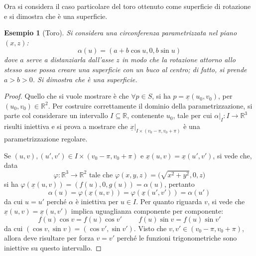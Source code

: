 \documentclass[12pt]{article}
\theoremstyle{style}
\newtheorem{esempio}{Esempio}[section]
\numberwithin{equation}{subsection}
\begin{document}
\noindent Ora si considera il caso particolare del toro ottenuto come superficie di rotazione e si dimostra che \`e una superficie.
\begin{esempio}
	[Toro]
	Si considera una circonferenza parametrizzata nel piano $(x,z)$:
	\[
	\alpha (u) = (a + b\cos u , 0 , b \sin u)
	\] 
	dove $a$ serve a distanziarla dall'asse $z$ in modo che la rotazione attorno allo stesso asse possa creare una superficie con un buco al centro; di fatto, si prende $a > b > 0$.
	Si dimostra che \`e una superficie.
\end{esempio}
\begin{proof}
	Quello che si vuole mostrare \`e che $\forall p \in S$, si ha $p = \underline{x}(u_0,v_0)$, per $(u_0,v_0) \in \mathbb{R}^2$.
	Per costruire correttamente il dominio della parametrizzazione, si parte col considerare un intervallo $I \subseteq \mathbb{R}$, contenente $u_0$, tale per cui $\alpha |_I:I\to\mathbb{R}^3$ risulti iniettiva e si prova a mostrare che $\underline{x}|_{I \times (v_0-\pi,v_0+\pi)} $ \`e una parametrizzazione regolare.

	Se $(u,v), (u',v') \in I \times (v_0-\pi,v_0+\pi)$ e $\underline{x}(u,v) = \underline{x}(u',v')$, si vede che, data
	\[
	\varphi : \mathbb{R}^3 \to \mathbb{R}^2 \text{ tale che } \varphi (x,y,z) = \big(\sqrt{x^2 + y^2 } ,0,z\big)
	\] 
	si ha $\varphi (\underline{x}(u,v)) = (f(u),0,g(u)) = \alpha (u)$, pertanto 
	\[
	\alpha (u) = \varphi (\underline{x}(u,v)) = \varphi (\underline{x}(u',v')) = \alpha (u')
	\] 
	da cui $u = u'$ perch\'e $\alpha $ \`e iniettiva per $u \in I$.
	Per quanto riguarda $v$, si vede che $\underline{x}(u,v) = \underline{x}(u,v')$ implica uguaglianza componente per componente:
	\[
	f(u) \cos v =  f (u ) \cos v' \hspace{1cm}f(u) \sin v = f(u) \sin v ' 
	\] 
	da cui $(\cos v , \sin v ) = (\cos v',\sin v')$. 
	Visto che $v , v' \in (v_0 - \pi, v_0 + \pi)$, allora deve risultare per forza $v = v'$ perch\'e le funzioni trigonometriche sono iniettive su questo intervallo.


\end{proof}
\end{document}

